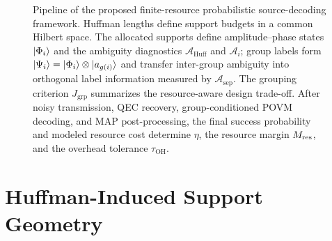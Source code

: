 \documentclass[
 reprint,
 amsmath,amssymb,
 aps,
 pra,
 floatfix,
]{revtex4-2}
\begin{document}
\begin{figure}[t]
{}
\caption{\label{fig:pipeline}Pipeline of the proposed finite-resource probabilistic source-decoding framework. Huffman lengths define support budgets in a common Hilbert space. The allocated supports define amplitude--phase states $\ket{\Phi_i}$ and the ambiguity diagnostics \(\mathcal A_{\mathrm{Huff}}\) and \(\mathcal A_i\); group labels form $\ket{\Psi_i}=\ket{\Phi_i}\otimes\ket{a_{g(i)}}$ and transfer inter-group ambiguity into orthogonal label information measured by \(\mathcal A_{\mathrm{sep}}\). The grouping criterion \(J_{\mathrm{grp}}\) summarizes the resource-aware design trade-off. After noisy transmission, QEC recovery, group-conditioned POVM decoding, and MAP post-processing, the final success probability and modeled resource cost determine \(\eta\), the resource margin \(M_{\rm res}\), and the overhead tolerance \(\tau_{\mathrm{OH}}\).}
\end{figure}

\section{Huffman-Induced Support Geometry}
\label{sec:support_geometry}
\end{document}
